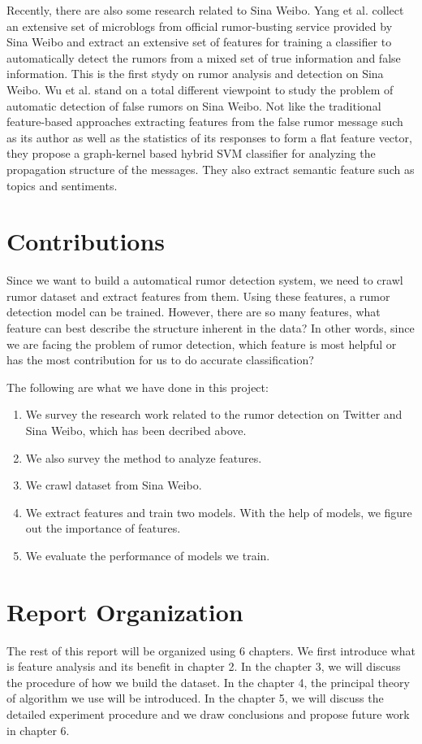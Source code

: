 Recently, there are also some research related to Sina Weibo. Yang et al. collect an extensive set of microblogs from official rumor-busting service provided by Sina Weibo and extract an extensive set of features for training a classifier to automatically detect the rumors from a mixed set of true information and false information. This is the first stydy on rumor analysis and detection on Sina Weibo\cite{yang2012automatic}. Wu et al. stand on a total different viewpoint to study the problem of automatic detection of false rumors on Sina Weibo\cite{wu2015false}. Not like the traditional feature-based approaches extracting features from the false rumor message such as its author as well as the statistics of its responses to form a flat feature vector, they propose a graph-kernel based hybrid SVM classifier for analyzing the propagation structure of the messages. They also extract semantic feature such as topics and sentiments.

\section{Contributions}
Since we want to build a automatical rumor detection system, we need to crawl rumor dataset and extract features from them. Using these features, a rumor detection model can be trained. However, there are so many features, what feature can best describe the structure inherent in the data? In other words, since we are facing the problem of rumor detection, which feature is most helpful or has the most contribution for us to do accurate classification?

The following are what we have done in this project:\begin{enumerate} \item We survey the research work related to the rumor detection on Twitter and Sina Weibo, which has been decribed above.\item We also survey the method to analyze features.\item We crawl dataset from Sina Weibo. \item We extract features and train two models. With the help of models, we figure out the importance of features.\item We evaluate the performance of models we train.
\end{enumerate}
\section{Report Organization}
The rest of this report will be organized using 6 chapters. We first introduce what is feature analysis and its benefit in chapter 2. In the chapter 3, we will discuss the procedure of how we build the dataset. In the chapter 4, the principal theory of algorithm we use will be introduced. In the chapter 5, we will discuss the detailed experiment procedure and we draw conclusions and propose future work in chapter 6.
